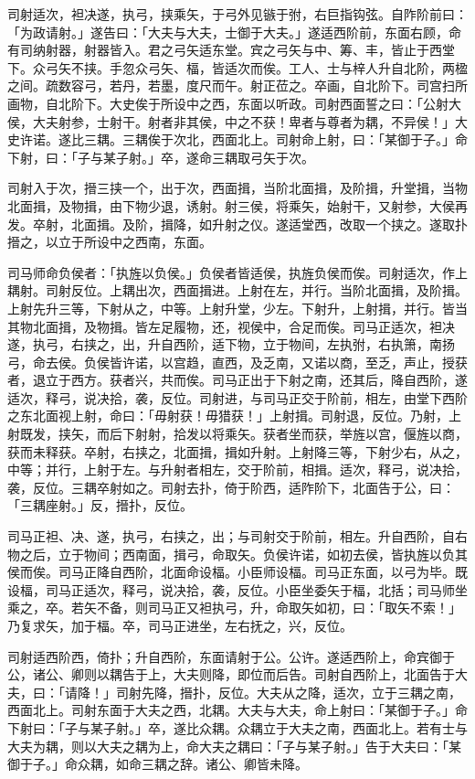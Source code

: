 \documentclass[]{article}
\begin{document}
司射适次，袒决遂，执弓，挟乘矢，于弓外见镞于弣，右巨指钩弦。自阼阶前曰：「为政请射。」遂告曰：「大夫与大夫，士御于大夫。」遂适西阶前，东面右顾，命有司纳射器，射器皆入。君之弓矢适东堂。宾之弓矢与中、筹、丰，皆止于西堂下。众弓矢不挟。手忽众弓矢、楅，皆适次而俟。工人、士与梓人升自北阶，两楹之间。疏数容弓，若丹，若墨，度尺而午。射正莅之。卒画，自北阶下。司宫扫所画物，自北阶下。大史俟于所设中之西，东面以听政。司射西面誓之曰：「公射大侯，大夫射参，士射干。射者非其侯，中之不获！卑者与尊者为耦，不异侯！」大史许诺。遂比三耦。三耦俟于次北，西面北上。司射命上射，曰：「某御于子。」命下射，曰：「子与某子射。」卒，遂命三耦取弓矢于次。

司射入于次，搢三挟一个，出于次，西面揖，当阶北面揖，及阶揖，升堂揖，当物北面揖，及物揖，由下物少退，诱射。射三侯，将乘矢，始射干，又射参，大侯再发。卒射，北面揖。及阶，揖降，如升射之仪。遂适堂西，改取一个挟之。遂取扑搢之，以立于所设中之西南，东面。

司马师命负侯者：「执旌以负侯。」负侯者皆适侯，执旌负侯而俟。司射适次，作上耦射。司射反位。上耦出次，西面揖进。上射在左，并行。当阶北面揖，及阶揖。上射先升三等，下射从之，中等。上射升堂，少左。下射升，上射揖，并行。皆当其物北面揖，及物揖。皆左足履物，还，视侯中，合足而俟。司马正适次，袒决遂，执弓，右挟之，出，升自西阶，适下物，立于物间，左执弣，右执箫，南扬弓，命去侯。负侯皆许诺，以宫趋，直西，及乏南，又诺以商，至乏，声止，授获者，退立于西方。获者兴，共而俟。司马正出于下射之南，还其后，降自西阶，遂适次，释弓，说决拾，袭，反位。司射进，与司马正交于阶前，相左，由堂下西阶之东北面视上射，命曰：「毋射获！毋猎获！」上射揖。司射退，反位。乃射，上射既发，挟矢，而后下射射，拾发以将乘矢。获者坐而获，举旌以宫，偃旌以商，获而未释获。卒射，右挟之，北面揖，揖如升射。上射降三等，下射少右，从之，中等；并行，上射于左。与升射者相左，交于阶前，相揖。适次，释弓，说决拾，袭，反位。三耦卒射如之。司射去扑，倚于阶西，适阼阶下，北面告于公，曰：「三耦座射。」反，搢扑，反位。

司马正袒、决、遂，执弓，右挟之，出；与司射交于阶前，相左。升自西阶，自右物之后，立于物间；西南面，揖弓，命取矢。负侯许诺，如初去侯，皆执旌以负其侯而俟。司马正降自西阶，北面命设楅。小臣师设楅。司马正东面，以弓为毕。既设楅，司马正适次，释弓，说决拾，袭，反位。小臣坐委矢于楅，北括；司马师坐乘之，卒。若矢不备，则司马正又袒执弓，升，命取矢如初，曰：「取矢不索！」乃复求矢，加于楅。卒，司马正进坐，左右抚之，兴，反位。

司射适西阶西，倚扑；升自西阶，东面请射于公。公许。遂适西阶上，命宾御于公，诸公、卿则以耦告于上，大夫则降，即位而后告。司射自西阶上，北面告于大夫，曰：「请降！」司射先降，搢扑，反位。大夫从之降，适次，立于三耦之南，西面北上。司射东面于大夫之西，北耦。大夫与大夫，命上射曰：「某御于子。」命下射曰：「子与某子射。」卒，遂比众耦。众耦立于大夫之南，西面北上。若有士与大夫为耦，则以大夫之耦为上，命大夫之耦曰：「子与某子射。」告于大夫曰：「某御于子。」命众耦，如命三耦之辞。诸公、卿皆未降。
\end{document}
